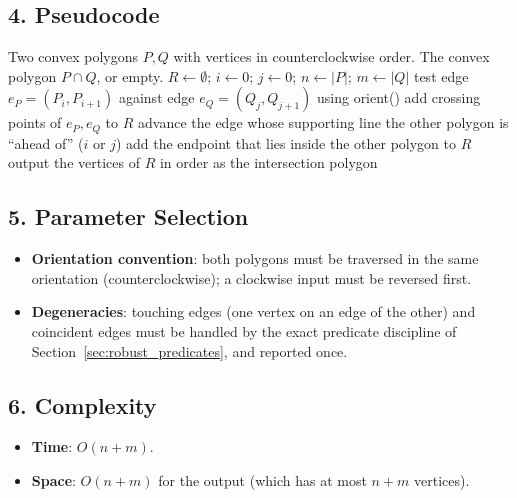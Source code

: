 \subsection{4. Pseudocode}

\begin{algorithm}[htbp]
\caption{Intersection of Two Convex Polygons}
\label{alg:convexint_polygon_intersection}
\begin{algorithmic}[1]
\Require Two convex polygons $P, Q$ with vertices in counterclockwise order.
\Ensure The convex polygon $P \cap Q$, or empty.
  \State $R \gets \emptyset$; $i \gets 0$; $j \gets 0$; $n \gets |P|$; $m \gets |Q|$
    \State test edge $e_P = (P_i, P_{i+1})$ against edge $e_Q = (Q_j, Q_{j+1})$ using orient()
    \State add crossing points of $e_P, e_Q$ to $R$
    \State advance the edge whose supporting line the other polygon is ``ahead of'' ($i$ or $j$)
    \State add the endpoint that lies inside the other polygon to $R$
  \EndWhile
  \State output the vertices of $R$ in order as the intersection polygon
\EndFunction
\end{algorithmic}
\end{algorithm}

\subsection{5. Parameter Selection}

\begin{itemize}
\item \textbf{Orientation convention}: both polygons must be traversed in
  the same orientation (counterclockwise); a clockwise input must be
  reversed first.
\item \textbf{Degeneracies}: touching edges (one vertex on an edge of the
  other) and coincident edges must be handled by the exact predicate
  discipline of Section~\ref{sec:robust_predicates}, and reported once.
\end{itemize}

\subsection{6. Complexity}

\begin{itemize}
\item \textbf{Time}: $O(n + m)$.
\item \textbf{Space}: $O(n + m)$ for the output (which has at most
  $n + m$ vertices).
\end{itemize}

